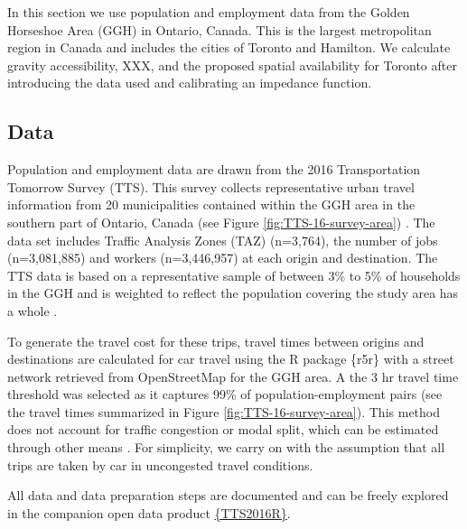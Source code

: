 \documentclass[]{elsarticle} %
\begin{document}
In this section we use population and employment data from the Golden
Horseshoe Area (GGH) in Ontario, Canada. This is the largest
metropolitan region in Canada and includes the cities of Toronto and
Hamilton. We calculate gravity accessibility, XXX, and the proposed
spatial availability for Toronto after introducing the data used and
calibrating an impedance function.

\hypertarget{data}{%
\subsection{Data}\label{data}}

Population and employment data are drawn from the 2016 Transportation
Tomorrow Survey (TTS). This survey collects representative urban travel
information from 20 municipalities contained within the GGH area in the
southern part of Ontario, Canada (see Figure
\ref{fig:TTS-16-survey-area}) \citep{data_management_group_tts_2018}.
The data set includes Traffic Analysis Zones (TAZ) (n=3,764), the number
of jobs (n=3,081,885) and workers (n=3,446,957) at each origin and
destination. The TTS data is based on a representative sample of between
3\% to 5\% of households in the GGH and is weighted to reflect the
population covering the study area has a whole
\citep{data_management_group_tts_2018}.

To generate the travel cost for these trips, travel times between
origins and destinations are calculated for car travel using the R
package \{r5r\} \citep{r5r_2021} with a street network retrieved from
OpenStreetMap for the GGH area. A the 3 hr travel time threshold was
selected as it captures 99\% of population-employment pairs (see the
travel times summarized in Figure \ref{fig:TTS-16-survey-area}). This
method does not account for traffic congestion or modal split, which can
be estimated through other means
\citep[e.g.,][]{allen_suburbanization_2021, higgins2021changes}. For
simplicity, we carry on with the assumption that all trips are taken by
car in uncongested travel conditions.

All data and data preparation steps are documented and can be freely
explored in the companion open data product
\href{https://soukhova.github.io/TTS2016R/}{\{TTS2016R\}}.
\end{document}
